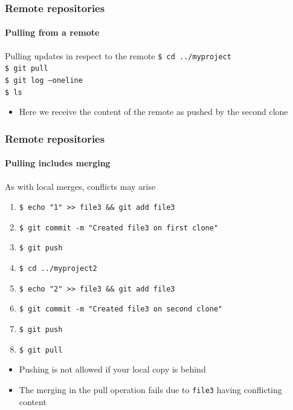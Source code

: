 \begin{frame}
\frametitle{Remote repositories}
\framesubtitle{Pulling from a remote}

\begin{block}{Pulling updates in respect to the remote}
\texttt{\$ cd ../myproject} \\
\texttt{\$ git pull} \\
\texttt{\$ git log ---oneline} \\
\texttt{\$ ls}

\begin{itemize}
\item Here we receive the content of the remote as pushed by the second clone
\end{itemize}
\end{block}

\end{frame}

\begin{frame}
\frametitle{Remote repositories}
\framesubtitle{Pulling includes merging}

\begin{block}{As with local merges, conflicts may arise}
\begin{enumerate}
\item \texttt{\$ echo "1" >\;\!\!> file3 \&\& git add file3} 
\item \texttt{\$ git commit -m "Created file3 on first clone"} 
\item \texttt{\$ git push} 
\item \texttt{\$ cd ../myproject2} 
\item \texttt{\$ echo "2" >\;\!\!> file3 \&\& git add file3}
\item \texttt{\$ git commit -m "Created file3 on second clone"}
\item \texttt{\$ git push}
\item \texttt{\$ git pull}
\end{enumerate}

\begin{itemize}
\item Pushing is not allowed if your local copy is behind
\item The merging in the pull operation fails due to \texttt{file3} having conflicting content
\end{itemize}
\end{block}

\end{frame}

